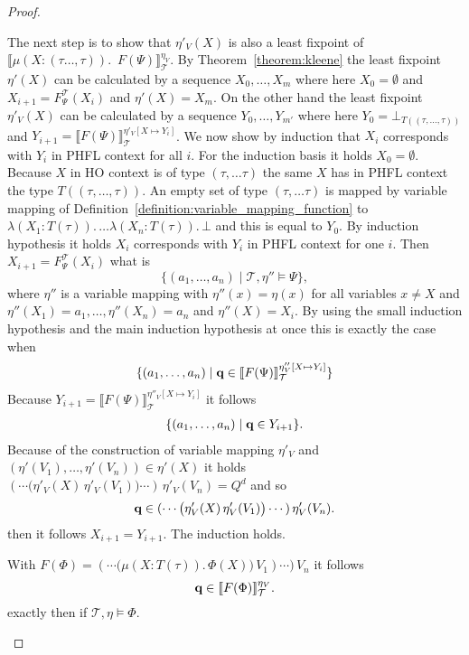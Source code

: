 \begin{proof}
\begin{compactitem}
        
The next step is to show that $\eta'_V(X)$ is also a least fixpoint of $\llbracket
         \mu(X\colon (\tau \dots, \tau)).\,$ $F(\Psi) \rrbracket^{\eta_V}_\mathcal{T}$. By Theorem~\ref{theorem:kleene} the least fixpoint $\eta'(X)$ can be calculated by a sequence $X_0, 
         \dots, X_m$ where here $X_0 = \emptyset$ and $X_{i+1} = F_\Psi^\mathcal{T}(X_i)$ and $\eta'(X) = X_m$. On the other hand the least fixpoint $\eta'_V(X)$ can be calculated by a 
         sequence $Y_0, \dots, Y_{m'}$ where here 
         $Y_0 = \bot_{T((\tau, \dots, \tau))}$ 
         and $Y_{i+1} = \llbracket F(\Psi)\rrbracket_\mathcal{T}^{\eta'_V[X \mapsto Y_i]}$. We now show by induction that $X_i$ corresponds with $Y_i$ in PHFL context for all $i$. For the induction basis it holds $X_0 = \emptyset$. Because $X$ in HO context is of type $(\tau, \dots \tau)$ the same $X$ has in PHFL context the type $T((\tau, \dots, \tau))$. An empty set of type $(\tau, \dots \tau)$ is mapped by variable mapping of Definition~\ref{definition:variable_mapping_function} to  $\lambda (X_1 \colon T(\tau)).\, \dots \lambda (X_n \colon T(\tau)).\,\bot$ and this is equal to $Y_0$. By induction hypothesis it holds $X_i$ corresponds with $Y_i$  in PHFL context for 
         one $i$. Then $X_{i+1} = F_\Psi^\mathcal{T}(X_i)$ what is
         \[\{(a_1, \dots, a_n) \mid \mathcal{T}, \eta'' \models \Psi\},\]
         where $\eta''$ is a variable mapping with $\eta''(x) = \eta(x)$ for all variables $x \neq X$ and $\eta''(X_{1}) = a_1, \dots,  \eta''(X_{n}) = a_n$ and $\eta''(X) = X_i$.  
         By using the small induction hypothesis and the main induction hypothesis at once this is exactly the case when
                 \begin{align*}
                 \{(a_1, \dots, a_n) \mid 
        \emph{q} \in \llbracket
        F(\Psi) \rrbracket^{\eta''_V[X\mapsto Y_i]}_\mathcal{T}\}
        \end{align*}
		Because $Y_{i+1} = \llbracket F(\Psi)\rrbracket_\mathcal{T}^{\eta''_V[X \mapsto Y_i]}$ it follows        
        \begin{align*}
                 \{(a_1, \dots, a_n) \mid 
        \emph{q} \in Y_{i+1}\}.
        \end{align*}
                Because of the construction of variable mapping $\eta'_V$ and $(\eta'(V_1), \dots, \eta'(V_n)) \in \eta'(X)$ it holds
        $(\dotsb\big(\eta'_V(X)\,\eta'_V(V_1)\big) \dotsb )\,\eta'_V(V_n) = Q^d$
        and so 
        \begin{align*}
        \emph{q} \in (\dotsb \big(\eta'_V(X)\,\eta'_V(V_1)\big) \dotsb )\,\eta'_V(V_n).
        \end{align*} 
       then it follows $X_{i+1} = Y_{i+1}$. The induction holds.        

        With $F(\Phi) = (\dotsb \big(\mu (X \colon T(\tau)).\,\Phi(X)\big)\,V_1)\dotsb)\,V_n$ it follows
        \[\emph{q} \in \llbracket
         F(\Phi) \rrbracket^{\eta_V}_\mathcal{T}.\]
        exactly then if $\mathcal{T}, \eta \models \Phi$.
    \end{compactitem}
\end{proof}


